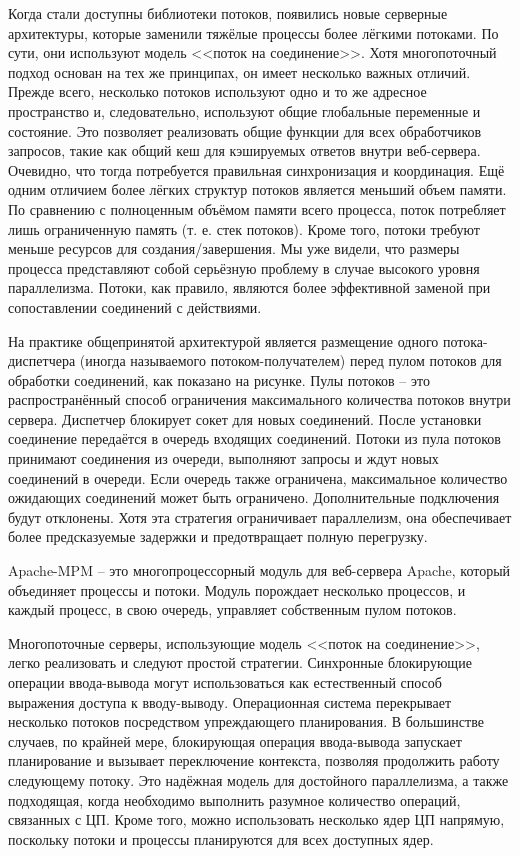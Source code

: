Когда стали доступны библиотеки потоков, появились новые серверные архитектуры, которые заменили тяжёлые процессы более лёгкими потоками. По сути, они используют модель <<поток на соединение>>. Хотя многопоточный подход основан на тех же принципах, он имеет несколько важных отличий. Прежде всего, несколько потоков используют одно и то же адресное пространство и, следовательно, используют общие глобальные переменные и состояние. Это позволяет реализовать общие функции для всех обработчиков запросов, такие как общий кеш для кэшируемых ответов внутри веб-сервера. Очевидно, что тогда потребуется правильная синхронизация и координация. Ещё одним отличием более лёгких структур потоков является меньший объем памяти. По сравнению с полноценным объёмом памяти всего процесса, поток потребляет лишь ограниченную память (т. е. стек потоков). Кроме того, потоки требуют меньше ресурсов для создания/завершения. Мы уже видели, что размеры процесса представляют собой серьёзную проблему в случае высокого уровня параллелизма. Потоки, как правило, являются более эффективной заменой при сопоставлении соединений с действиями.

На практике общепринятой архитектурой является размещение одного потока-диспетчера (иногда называемого потоком-получателем) перед пулом потоков для обработки соединений, как показано на рисунке. Пулы потоков -- это распространённый способ ограничения максимального количества потоков внутри сервера. Диспетчер блокирует сокет для новых соединений. После установки соединение передаётся в очередь входящих соединений. Потоки из пула потоков принимают соединения из очереди, выполняют запросы и ждут новых соединений в очереди. Если очередь также ограничена, максимальное количество ожидающих соединений может быть ограничено. Дополнительные подключения будут отклонены. Хотя эта стратегия ограничивает параллелизм, она обеспечивает более предсказуемые задержки и предотвращает полную перегрузку.

Apache-MPM -- это многопроцессорный модуль для веб-сервера Apache, который объединяет процессы и потоки. Модуль порождает несколько процессов, и каждый процесс, в свою очередь, управляет собственным пулом потоков.

Многопоточные серверы, использующие модель <<поток на соединение>>, легко реализовать и следуют простой стратегии. Синхронные блокирующие операции ввода-вывода могут использоваться как естественный способ выражения доступа к вводу-выводу. Операционная система перекрывает несколько потоков посредством упреждающего планирования. В большинстве случаев, по крайней мере, блокирующая операция ввода-вывода запускает планирование и вызывает переключение контекста, позволяя продолжить работу следующему потоку. Это надёжная модель для достойного параллелизма, а также подходящая, когда необходимо выполнить разумное количество операций, связанных с ЦП. Кроме того, можно использовать несколько ядер ЦП напрямую, поскольку потоки и процессы планируются для всех доступных ядер.

